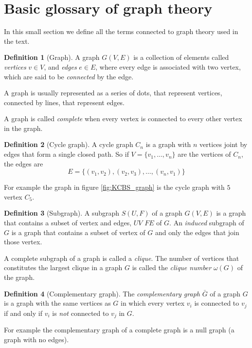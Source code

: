 \documentclass[a4paper]{article}
\theoremstyle{definition}
\newtheorem{definition}{Definition}[section]
\begin{document}
\section{Basic glossary of graph theory}
\label{sec:graph}
In this small section we define all the terms connected to graph theory used in
the text.
\begin{definition}[Graph]
    A graph $G(V,E)$ is a collection of elements called \emph{vertices} $v\in
    V$, and \emph{edges} $e\in E$, where every edge is associated with two
    vertex, which are said to be \emph{connected} by the edge.
\end{definition}
A graph is usually represented as a series of dots, that represent vertices,
connected by lines, that represent edges.

A graph is called \emph{complete} when every vertex is connected to every other vertex
in the graph.

\begin{definition}[Cycle graph]
    A cycle graph $C_n$ is a graph with $n$ vertices joint by edges that form a single closed path.
    So if $V = \{v_1,\ldots,v_n\}$ are the vertices of $C_n$, the edges are
    \begin{equation}
        E = \{(v_1,v_2),(v_2,v_3),\ldots,(v_n,v_1)\}
        \label{eq:cycle_edges}
    \end{equation}
\end{definition}
For example the graph in figure \ref{fig:KCBS_graph} is the cycle graph with
$5$ vertex $C_5$.

\begin{definition}[Subgraph]
    A subgraph $S(U,F)$ of a graph $G(V,E)$ is a graph that contains a subset of vertex
    and edges, $U V$ $F E$ of $G$. An \emph{induced} subgraph of $G$ is a graph that contains
    a subset of vertex of $G$ and only the edges that join those vertex.
\end{definition}

A complete subgraph of a graph is called a \emph{clique}.
The number of vertices that constitutes the largest clique in a graph $G$ is
called the \emph{clique number} $\omega(G)$ of the graph.

\begin{definition}[Complementary graph]
    The \emph{complementary graph} $\bar G$ of a graph $G$ is a graph with the same
    vertices as $G$ in which every vertex $v_i$ is connected to $v_j$ if and
    only if $v_i$ is \emph{not} connected to $v_j$ in $G$.
\end{definition}
For example the complementary graph of a complete graph is a null graph (a graph
with no edges).
\end{document}
